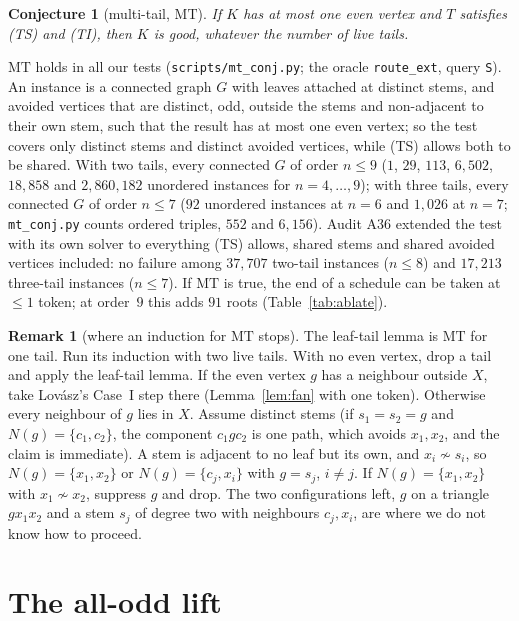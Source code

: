 \documentclass[11pt]{amsart}
\newtheorem{conjecture}[theorem]{Conjecture}
\theoremstyle{definition}
\newtheorem{remark}[theorem]{Remark}
\newcommand{\MT}{\mathrm{MT}}
\begin{document}
\begin{conjecture}[multi-tail, $\MT$]\label{conj:mt}
If $K$ has at most one even vertex and $T$ satisfies (TS) and (TI), then $K$ is good, whatever the
number of live tails.
\end{conjecture}

$\MT$ holds in all our tests (\texttt{scripts/mt\_conj.py}; the oracle \texttt{route\_ext}, query
\texttt{S}). An instance is a connected graph $G$ with leaves attached at distinct stems, and avoided
vertices that are distinct, odd, outside the stems and non-adjacent to their own stem, such that the
result has at most one even vertex; so the test covers only distinct stems and distinct avoided
vertices, while (TS) allows both to be shared. With two tails, every connected $G$ of order $n\le9$
($1$, $29$, $113$, $6{,}502$, $18{,}858$ and $2{,}860{,}182$ unordered instances for $n=4,\dots,9$);
with three tails, every connected $G$ of order $n\le7$ ($92$ unordered instances at $n=6$ and
$1{,}026$ at $n=7$; \texttt{mt\_conj.py} counts ordered triples, $552$ and $6{,}156$). Audit A36 extended
the test with its own solver to everything (TS) allows, shared stems and shared avoided vertices
included: no failure among $37{,}707$ two-tail instances ($n\le8$) and $17{,}213$ three-tail
instances ($n\le7$). If $\MT$ is true, the
end of a schedule can be taken at $\le1$ token; at order~$9$ this adds $91$ roots
(Table~\ref{tab:ablate}).

\begin{remark}[where an induction for $\MT$ stops]\label{rem:mtind}
The leaf-tail lemma is $\MT$ for one tail. Run its induction with two live tails. With no even
vertex, drop a tail and apply the leaf-tail lemma. If the even vertex $g$ has a neighbour outside
$X$, take Lov\'asz's Case~I step there (Lemma~\ref{lem:fan} with one token). Otherwise every
neighbour of $g$ lies in $X$. Assume distinct stems (if $s_1=s_2=g$ and $N(g)=\{c_1,c_2\}$, the
component $c_1gc_2$ is one path, which avoids $x_1,x_2$, and the claim is immediate). A stem is
adjacent to no leaf but its own, and $x_i\not\sim s_i$, so
$N(g)=\{x_1,x_2\}$ or $N(g)=\{c_j,x_i\}$ with $g=s_j$, $i\ne j$. If $N(g)=\{x_1,x_2\}$ with $x_1\not\sim x_2$,
suppress $g$ and drop. The two configurations left, $g$ on a triangle $gx_1x_2$ and a stem
$s_j$ of degree two with neighbours $c_j,x_i$, are where we do not know how to proceed.
\end{remark}

\section{The all-odd lift}\label{sec:aodd}
\end{document}
